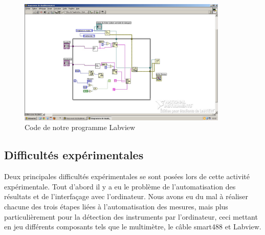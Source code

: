 \begin{figure}[!t]
  \begin{center}
		\includegraphics[height=6cm]{./images/labview.jpg}
		\caption{Code de notre programme Labview}
		\label{code_labview}
	\end{center}
\end{figure}


\subsection{Difficultés expérimentales}
Deux principales difficultés expérimentales se sont posées lors de cette activité expérimentale.
Tout d'abord il y a eu le problème de l'automatisation des résultats et de l'interfaçage avec l'ordinateur.
Nous avons eu du mal à réaliser chacune des trois étapes liées à l'automatisation des mesures, mais plus particulièrement 
pour la détection des instruments par l'ordinateur, ceci mettant en jeu différents composants tels que le 
multimètre, le câble smart488 et Labview.

